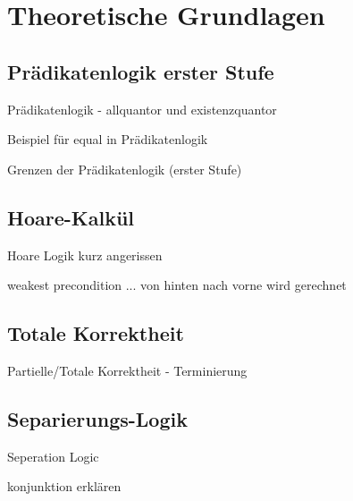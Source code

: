﻿
\chapter{Theoretische Grundlagen}

\section{Prädikatenlogik erster Stufe}

Prädikatenlogik - allquantor und existenzquantor


Beispiel für equal in Prädikatenlogik


Grenzen der Prädikatenlogik (erster Stufe)

\section{Hoare-Kalkül}

Hoare Logik kurz angerissen

weakest precondition ... von hinten nach vorne wird gerechnet


\section{Totale Korrektheit}

Partielle/Totale Korrektheit - Terminierung

\section{Separierungs-Logik}
\label{sec:theorie:seperation-logic}

Seperation Logic

konjunktion erklären

